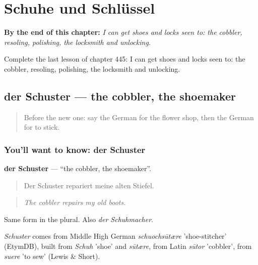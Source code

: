 
\chapter{Schuhe und Schlüssel}
\label{ch:ge-schuhe-und-schlussel}

\begin{chapteropening}
\textbf{By the end of this chapter:} \emph{I can get shoes and locks seen to: the cobbler, resoling, polishing, the locksmith and unlocking.}

Complete the last lesson of chapter 445: I can get shoes and locks seen to: the cobbler, resoling, polishing, the locksmith and unlocking.
\end{chapteropening}

\section[der Schuster]{der Schuster — the cobbler, the shoemaker}

\label{lesson:GE-C445-schuster}



\begin{quote}
Before the new one: say the German for the flower shop, then the German for to stick.
\end{quote}

\subsection*{You'll want to know: der Schuster}
\textbf{der Schuster} — \textquotedblleft{}the cobbler, the shoemaker\textquotedblright{}.

\begin{quote}
Der Schuster repariert meine alten Stiefel.
\end{quote}

\begin{quote}
\emph{The cobbler repairs my old boots.}
\end{quote}

Same form in the plural. Also \emph{der Schuhmacher}.

\begin{cousinweb}
\emph{Schuster} comes from Middle High German \emph{schuochsūtære} 'shoe-stitcher' (EtymDB), built from \emph{Schuh} 'shoe' and \emph{sūtære}, from Latin \emph{sūtor} 'cobbler', from \emph{suere} 'to sew' (Lewis \& Short).
\end{cousinweb}

